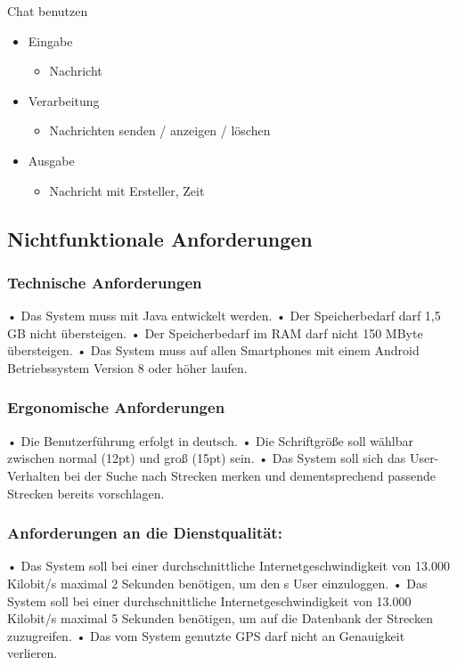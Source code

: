 \documentclass[a4paper, 12pt]{article}
\begin{document}
\bigskip
{\Large Chat benutzen}\\
\begin{itemize}
\item Eingabe
	\begin{itemize}
	\item Nachricht
	\end{itemize}
\item Verarbeitung
	\begin{itemize}
	\item Nachrichten senden / anzeigen / löschen
	\end{itemize}
\item Ausgabe
	\begin{itemize}
	\item Nachricht mit Ersteller, Zeit
	\end{itemize}
\end{itemize}
\subsection{Nichtfunktionale Anforderungen}
\subsubsection{Technische Anforderungen}
\label{technAnf}
• Das System muss mit Java entwickelt werden.\newline
• Der Speicherbedarf darf 1,5 GB nicht übersteigen.\newline
• Der Speicherbedarf im RAM darf nicht 150 MByte übersteigen.\newline
• Das System muss auf allen Smartphones mit einem Android Betriebssystem Version 8 oder höher laufen.
\subsubsection{Ergonomische Anforderungen}
• Die Benutzerführung erfolgt in deutsch.\newline
\label{Lesbarkeit}
• Die Schriftgröße soll wählbar zwischen normal (12pt) und groß (15pt) sein.\newline
\label{Vorschlaege}
• Das System soll sich das User-Verhalten bei der Suche nach Strecken merken und dementsprechend passende Strecken bereits vorschlagen.
\subsubsection{Anforderungen an die Dienstqualität:}
\label{Warten}
• Das System soll bei einer durchschnittliche Internetgeschwindigkeit von 13.000 Kilobit/s maximal 2 Sekunden benötigen, um den s User einzuloggen.\newline
• Das System soll bei einer durchschnittliche Internetgeschwindigkeit von 13.000 Kilobit/s maximal 5 Sekunden benötigen, um auf die Datenbank der Strecken zuzugreifen.\newline
• Das vom System genutzte GPS darf nicht an Genauigkeit verlieren.
\end{document}
